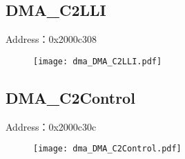 \subsection{DMA\_C2LLI}
\label{dma-DMA-C2LLI}
Address：0x2000c308
 \begin{figure}[H]
\texttt{[image: dma\_DMA\_C2LLI.pdf]}
\end{figure}

\subsection{DMA\_C2Control}
\label{dma-DMA-C2Control}
Address：0x2000c30c
 \begin{figure}[H]
\texttt{[image: dma\_DMA\_C2Control.pdf]}
\end{figure}


